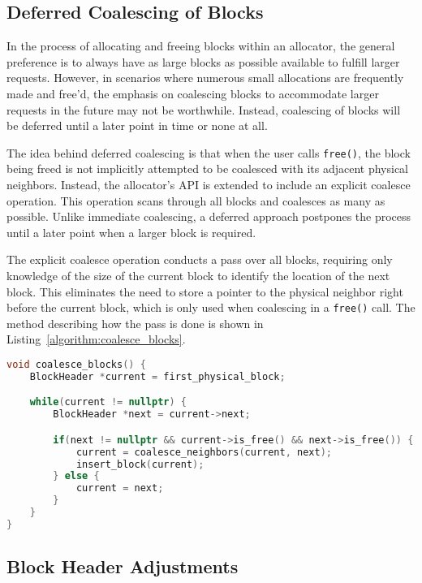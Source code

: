 \subsection{Deferred Coalescing of Blocks}

In the process of allocating and freeing blocks within an allocator, the general preference is to always have as large blocks as possible available to fulfill larger requests. However, in scenarios where numerous small allocations are frequently made and free'd, the emphasis on coalescing blocks to accommodate larger requests in the future may not be worthwhile. Instead, coalescing of blocks will be deferred until a later point in time or none at all.

The idea behind deferred coalescing is that when the user calls \texttt{free()}, the block being freed is not implicitly attempted to be coalesced with its adjacent physical neighbors. Instead, the allocator's API is extended to include an explicit coalesce operation. This operation scans through all blocks and coalesces as many as possible. Unlike immediate coalescing, a deferred approach postpones the process until a later point when a larger block is required.

The explicit coalesce operation conducts a pass over all blocks, requiring only knowledge of the size of the current block to identify the location of the next block. This eliminates the need to store a pointer to the physical neighbor right before the current block, which is only used when coalescing in a \texttt{free()} call. The method describing how the pass is done is shown in Listing~\ref{algorithm:coalesce_blocks}.

\begin{lstlisting}[language=C++, caption={Method for explicitly coalescing all possible free blocks in the allocator. Note that coalesce\_neighbors() removes both blocks from the free-list before the newly coalesced block is inserted.}, label={algorithm:coalesce_blocks}]
void coalesce_blocks() {
    BlockHeader *current = first_physical_block;

    while(current != nullptr) {
        BlockHeader *next = current->next;

        if(next != nullptr && current->is_free() && next->is_free()) {
            current = coalesce_neighbors(current, next);
            insert_block(current);
        } else {
            current = next;
        }
    }
}
\end{lstlisting}

\subsection{Block Header Adjustments}
\label{sec:adaptations:block-header-adjustments}

